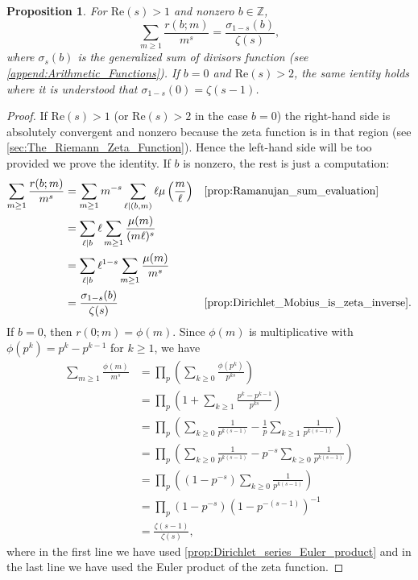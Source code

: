 \documentclass[12pt]{book}
\newtheorem{proposition}{Proposition}[section]
\theoremstyle{definition}\newframedtheorem{method}{Method}
\newcommand{\Z}{\mathbb{Z}}
\newcommand{\z}{\zeta}
\newcommand{\s}{\sigma}
\newcommand{\<}{\langle}
\renewcommand{\>}{\rangle}
\renewcommand{\Re}{\mathrm{Re}}
\begin{document}
      \begin{proposition}\label{prop:Ramanujan_zeta_relation}
        For $\Re(s) > 1$ and nonzero $b \in \Z$,
        \[
          \sum_{m \ge 1}\frac{r(b;m)}{m^{s}} = \frac{\s_{1-s}(b)}{\z(s)},
        \]
        where $\s_{s}(b)$ is the generalized sum of divisors function (see \cref{append:Arithmetic_Functions}). If $b = 0$ and $\Re(s) > 2$, the same ientity holds where it is understood that $\s_{1-s}(0) = \z(s-1)$.
      \end{proposition}
      \begin{proof}
        If $\Re(s) > 1$ (or $\Re(s) > 2$ in the case $b = 0$) the right-hand side is absolutely convergent and nonzero because the zeta function is in that region (see \cref{sec:The_Riemann_Zeta_Function}). Hence the left-hand side will be too provided we prove the identity. If $b$ is nonzero, the rest is just a computation:
        \begin{align*}
          \sum_{m \ge 1}\frac{r(b;m)}{m^{s}} &= \sum_{m \ge 1}m^{-s}\sum_{\ell \mid (b,m)}\ell\mu\left(\frac{m}{\ell}\right) && \text{\cref{prop:Ramanujan_sum_evaluation}} \\
          &= \sum_{\ell \mid b}\ell\sum_{m \ge 1}\frac{\mu(m)}{(m\ell)^{s}} \\
          &= \sum_{\ell \mid b}\ell^{1-s}\sum_{m \ge 1}\frac{\mu(m)}{m^{s}} \\
          &= \frac{\s_{1-s}(b)}{\z(s)} && \text{\cref{prop:Dirichlet_Mobius_is_zeta_inverse}}.
        \end{align*}
        If $b = 0$, then $r(0;m) = \phi(m)$. Since $\phi(m)$ is multiplicative with $\phi(p^{k}) = p^{k}-p^{k-1}$ for $k \ge 1$, we have
        \begin{align*}
          \sum_{m \ge 1}\frac{\phi(m)}{m^{s}} &= \prod_{p}\left(\sum_{k \ge 0}\frac{\phi(p^{k})}{p^{ks}}\right) \\
          &= \prod_{p}\left(1+\sum_{k \ge 1}\frac{p^{k}-p^{k-1}}{p^{ks}}\right) \\
          &= \prod_{p}\left(\sum_{k \ge 0}\frac{1}{p^{k(s-1)}}-\frac{1}{p}\sum_{k \ge 1}\frac{1}{p^{k(s-1)}}\right) \\
          &= \prod_{p}\left(\sum_{k \ge 0}\frac{1}{p^{k(s-1)}}-p^{-s}\sum_{k \ge 0}\frac{1}{p^{k(s-1)}}\right) \\
          &= \prod_{p}\left((1-p^{-s})\sum_{k \ge 0}\frac{1}{p^{k(s-1)}}\right) \\
          &= \prod_{p}(1-p^{-s})(1-p^{-(s-1)})^{-1} \\
          &= \frac{\z(s-1)}{\z(s)},
        \end{align*}
        where in the first line we have used \cref{prop:Dirichlet_series_Euler_product} and in the last line we have used the Euler product of the zeta function.
      \end{proof}
\end{document}
